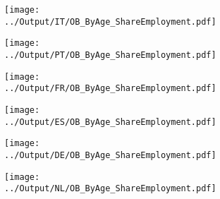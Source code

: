 \documentclass[12pt,notitlepage]{article}
\begin{document}
\begin{figure}[!htpb]
\centering
\begin{subfigure}{.49\textwidth}
    \centering
 \texttt{[image: ../Output/IT/OB\_ByAge\_ShareEmployment.pdf]}
\end{subfigure}%
\begin{subfigure}{.49\textwidth}
    \centering
 \texttt{[image: ../Output/PT/OB\_ByAge\_ShareEmployment.pdf]}
\end{subfigure}
\begin{subfigure}{.49\textwidth}
    \centering
 \texttt{[image: ../Output/FR/OB\_ByAge\_ShareEmployment.pdf]}
\end{subfigure}%
\begin{subfigure}{.49\textwidth}
    \centering
 \texttt{[image: ../Output/ES/OB\_ByAge\_ShareEmployment.pdf]}
\end{subfigure}
\begin{subfigure}{.49\textwidth}
    \centering
 \texttt{[image: ../Output/DE/OB\_ByAge\_ShareEmployment.pdf]}
\end{subfigure}
\begin{subfigure}{.49\textwidth}
    \centering
 \texttt{[image: ../Output/NL/OB\_ByAge\_ShareEmployment.pdf]}
\end{subfigure}
\end{figure}
\clearpage


\clearpage
\end{document}
